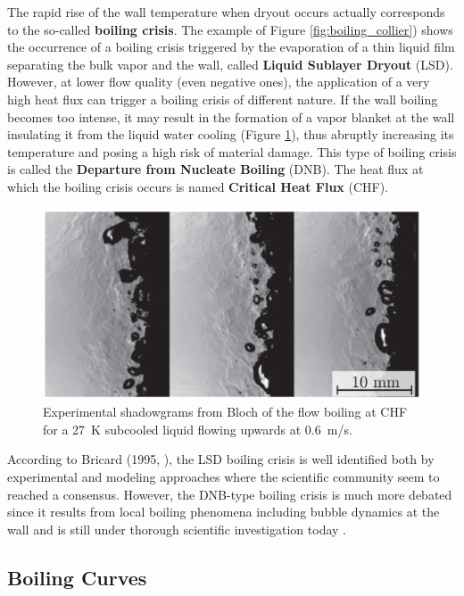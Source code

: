 The rapid rise of the wall temperature when dryout occurs actually corresponds to the so-called \textbf{boiling crisis}. The example of Figure \ref{fig:boiling_collier}) shows the occurrence of a boiling crisis triggered by the evaporation of a thin liquid film separating the bulk vapor and the wall, called \textbf{Liquid Sublayer Dryout} (LSD). However, at lower flow quality (even negative ones), the application of a very high heat flux can trigger a boiling crisis of different nature. If the wall boiling becomes too intense, it may result in the formation of a vapor blanket at the wall insulating it from the liquid water cooling (Figure \ref{fig:dnb_bloch}), thus abruptly increasing its temperature and posing a high risk of material damage. This type of boiling crisis is called the \textbf{Departure from Nucleate Boiling} (DNB). The heat flux at which the boiling crisis occurs is named \textbf{Critical Heat Flux} (CHF).


\begin{figure}[!h]
\centering
\includegraphics[width=0.65\linewidth]{img/intro/dnb_bloch.png}
\caption{Experimental shadowgrams from Bloch \etal \cite{bloch} of the flow boiling at CHF for a 27\ K subcooled liquid flowing upwards at 0.6\ m/s.}
\label{fig:dnb_bloch}
\end{figure}

\npar

According to Bricard (1995, \cite{bricard_phd_1995}), the LSD boiling crisis is well identified both by experimental and modeling approaches \cite{govan_1988} where the scientific community seem to reached a consensus. However, the DNB-type boiling crisis is much more debated since it results from local boiling phenomena including bubble dynamics at the wall and is still under thorough scientific investigation today \cite{kossolapov, richenderfer, demarly, bloch_bruder, bruder}.


\subsection{Boiling Curves}

